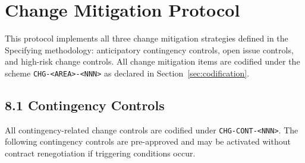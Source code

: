 \documentclass[11pt,a4paper]{article}
\let\origref\ref
\renewcommand{\ref}[1]{\uline{\origref{#1}}}%
\begin{document}


\section{Change Mitigation Protocol}

This protocol implements all three change mitigation strategies defined in the Specifying methodology: anticipatory contingency controls, open issue controls, and high-risk change controls. All change mitigation items are codified under the scheme \texttt{CHG-<AREA>-<NNN>} as declared in Section~\ref{sec:codification}.

\subsection{8.1 Contingency Controls}

All contingency-related change controls are codified under \texttt{CHG-CONT-<NNN>}. The following contingency controls are pre-approved and may be activated without contract renegotiation if triggering conditions occur.
\end{document}
